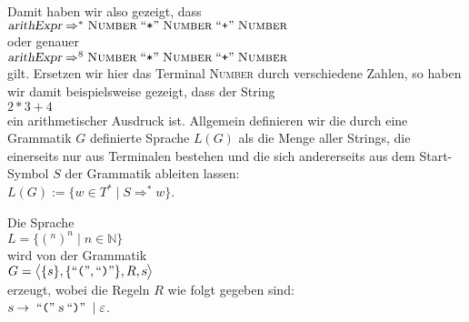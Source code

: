 Damit haben wir also gezeigt, dass
\\[0.2cm]
\hspace*{1.3cm}
$\textsl{arithExpr} \Rightarrow^* \textsc{Number} \;\mbox{``\texttt{*}''}\; \textsc{Number} \;\mbox{``\texttt{+}''}\; \textsc{Number}$
\\[0.2cm]
oder genauer
\\[0.2cm]
\hspace*{1.3cm}
$\textsl{arithExpr} \Rightarrow^8 \textsc{Number} \;\mbox{``\texttt{*}''}\; \textsc{Number} \;\mbox{``\texttt{+}''}\; \textsc{Number}$
\\[0.2cm]
gilt.  Ersetzen wir hier das Terminal \textsc{Number} durch verschiedene Zahlen, so haben wir damit
beispielsweise gezeigt, dass der String
\\[0.2cm]
\hspace*{1.3cm}
$2 * 3 + 4$
\\[0.2cm]
ein arithmetischer Ausdruck ist.  Allgemein definieren wir die durch eine Grammatik $G$ definierte
Sprache $L(G)$ als die Menge aller Strings, die einerseits nur aus Terminalen bestehen und die sich
andererseits aus dem Start-Symbol $S$ der Grammatik ableiten lassen:
\\[0.2cm]
\hspace*{1.3cm}
$L(G) := \bigl\{ w \in T^* \mid S \Rightarrow^* w \bigr\}$.


\example
Die Sprache
\\[0.2cm]
\hspace*{1.3cm}
$L = \{ (^n )^n \mid n \in \mathbb{N} \}$ 
\\[0.2cm]
wird von der Grammatik 
\\[0.2cm]
\hspace*{1.3cm}
$G = \bigl\langle \{s\}, \{ \mbox{``\texttt{(}''}, \mbox{``\texttt{)}''} \}, R, \textsl{s} \bigr\rangle$
\\[0.2cm]
erzeugt, wobei die Regeln $R$ wie folgt gegeben sind:
\\[0.2cm]
\hspace*{1.3cm}
$\textsl{s} \rightarrow \;\mbox{``\texttt{(}''}\; \textsl{s} \;\mbox{``\texttt{)}''}\;  \mid  \varepsilon$.





